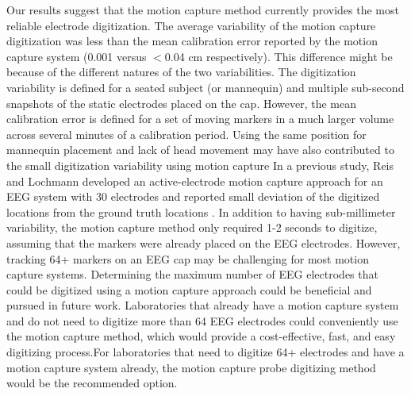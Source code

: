 \documentclass{UCF_ETD}
\newcommand{\ignore}[1]{}
\renewcommand{\ul}{}
\begin{document}
Our results suggest that the motion capture method currently \ul{provides the most reliable electrode digitization}. \ul{The average variability of the motion capture digitization was less than the mean calibration error reported by the motion capture system (0.001 versus $<$0.04 cm respectively). This difference might be because of the different natures of the two variabilities. The digitization variability is defined for a seated subject (or mannequin) and multiple sub-second snapshots of the static electrodes placed on the cap. However, the mean calibration error is defined for a set of moving markers in a much larger volume across several minutes of a calibration period. Using the same position for mannequin placement and lack of head movement may have also contributed to the small digitization variability using motion capture} In a previous study, Reis and Lochmann developed an active-electrode motion capture approach for an EEG system with 30 electrodes and reported small deviation of the digitized locations from the ground truth locations \citep{Reis2015-lt}. 
In addition to having sub-millimeter variability, the motion capture method only required 1-2 seconds to digitize, assuming that the markers were already placed on the EEG electrodes. However, tracking 64+ markers on an EEG cap may be challenging for most motion capture systems.\ignore{ In this study, we only tracked 35 markers on the EEG cap and may have been able to track more than 35 markers with our 22-camera motion capture system.} Determining the maximum number of EEG electrodes that could be digitized using a motion capture approach could be beneficial and pursued in future work. Laboratories that already have a motion capture system and do not need to digitize more than 64 EEG electrodes could conveniently use the motion capture method, which would provide a cost-effective, fast, and easy digitizing process.For laboratories that need to digitize 64+ electrodes and have a motion capture system already, the motion capture probe digitizing method would be the recommended option.
\end{document}
